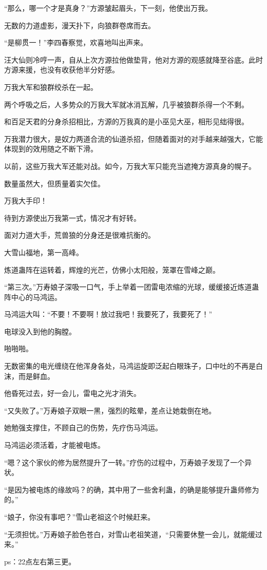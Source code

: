 \begin{this_body}
“那么，哪一个才是真身？”方源皱起眉头，下一刻，他使出万我。

无数的力道虚影，漫天扑下，向狼群卷席而去。

“是柳贯一！”李四春察觉，欢喜地叫出声来。

汪大仙则冷哼一声，自从上次方源拉他做垫背，他对方源的观感就降至谷底。此时方源来援，也没有收获他半分好感。

万我大军和狼群绞杀在一起。

两个呼吸之后，人多势众的万我大军就冰消瓦解，几乎被狼群杀得一个不剩。

和百足天君的分身杀招相比，方源的万我真的是小巫见大巫，相形见绌得很。

万我潜力很大，是奴力两道合流的仙道杀招，但随着面对的对手越来越强大，它能体现到的效用随之不断下滑。

以前，这些万我大军还能对战。如今，万我大军只能充当遮掩方源真身的幌子。

数量虽然大，但质量着实欠佳。

万我大手印！

待到方源使出万我第一式，情况才有好转。

面对力道大手，荒兽狼的分身还是很难抗衡的。

大雪山福地，第一高峰。

炼道蛊阵在运转着，辉煌的光芒，仿佛小太阳般，笼罩在雪峰之巅。

“第三次。”万寿娘子深吸一口气，手上举着一团雷电浓缩的光球，缓缓接近炼道蛊阵中心的马鸿运。

马鸿运大叫：“不要！不要啊！放过我吧！我要死了，我要死了！”

电球没入到他的胸膛。

啪啪啪。

无数密集的电光缠绕在他浑身各处，马鸿运旋即泛起白眼珠子，口中吐的不再是白沫，而是鲜血。

他昏死过去，好一会儿，雷电之光才消失。

“又失败了。”万寿娘子双眼一黑，强烈的眩晕，差点让她栽倒在地。

她勉强支撑住，不顾自己的伤势，先疗伤马鸿运。

马鸿运必须活着，才能被电炼。

“嗯？这个家伙的修为居然提升了一转。”疗伤的过程中，万寿娘子发现了一个异状。

“是因为被电炼的缘故吗？的确，其中用了一些舍利蛊，的确是能够提升蛊师修为的。”

“娘子，你没有事吧？”雪山老祖这个时候赶来。

“无须担忧。”万寿娘子脸色苍白，对雪山老祖笑道，“只需要休整一会儿，就能缓过来。”

ps：22点左右第三更。

\end{this_body}


